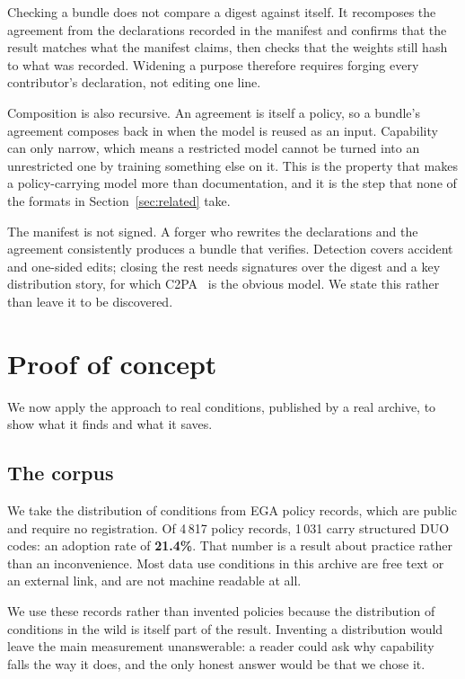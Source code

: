 \documentclass[sigconf,anonymous,review]{acmart}
\begin{document}
Checking a bundle does not compare a digest against itself. It recomposes the
agreement from the declarations recorded in the manifest and confirms that the
result matches what the manifest claims, then checks that the weights still hash
to what was recorded. Widening a purpose therefore requires forging every
contributor's declaration, not editing one line.

Composition is also recursive. An agreement is itself a policy, so a bundle's
agreement composes back in when the model is reused as an input. Capability can
only narrow, which means a restricted model cannot be turned into an unrestricted
one by training something else on it. This is the property that makes a
policy-carrying model more than documentation, and it is the step that none of the
formats in Section~\ref{sec:related} take.

The manifest is not signed. A forger who rewrites the declarations and the
agreement consistently produces a bundle that verifies. Detection covers accident
and one-sided edits; closing the rest needs signatures over the digest and a key
distribution story, for which C2PA~\cite{c2pa} is the obvious model. We state this
rather than leave it to be discovered.

\section{Proof of concept}
\label{sec:poc}

We now apply the approach to real conditions, published by a real archive, to
show what it finds and what it saves.

\subsection{The corpus}
\label{sec:corpus}

We take the distribution of conditions from EGA policy records, which are public
and require no registration. Of 4\,817 policy records, 1\,031 carry structured
DUO codes: an adoption rate of \textbf{21.4\%}. That number is a result about
practice rather than an inconvenience. Most data use conditions in this archive
are free text or an external link, and are not machine readable at all.

We use these records rather than invented policies because the distribution of
conditions in the wild is itself part of the result. Inventing a distribution
would leave the main measurement unanswerable: a reader could ask why capability
falls the way it does, and the only honest answer would be that we chose it.
\end{document}
